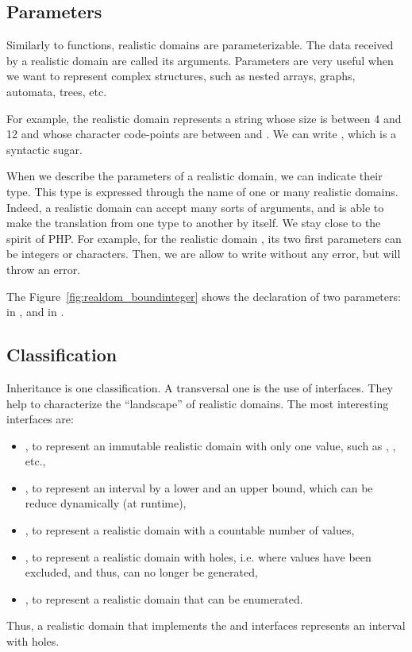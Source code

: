 \subsection{Parameters}

Similarly to functions, realistic domains are parameterizable. The data received
by a realistic domain are called its arguments. Parameters are very useful when
we want to represent complex structures, such as nested arrays, graphs,
automata, trees, etc.

For example, the realistic domain 
represents a string whose size is between 4 and 12 and whose character
code-points are between  and . We can write
, which is a syntactic sugar.

When we describe the parameters of a realistic domain, we can indicate their
type. This type is expressed through the name of one or many
realistic domains. Indeed, a realistic domain can accept many sorts of
arguments, and is able to make the translation from one type to another by
itself.  We stay close to the spirit of PHP. For example, for the realistic
domain , its two first parameters can be integers or characters.
Then, we are allow to write  without any error,
but  will throw an error.

The Figure~\ref{fig:realdom_boundinteger} shows the declaration of two
parameters:  in , and  in .

\subsection{Classification}\label{sec:domain}

Inheritance is one classification. A transversal one is the use of interfaces.
They help to characterize the ``landscape'' of realistic domains. The most
interesting interfaces are:
\begin{itemize}
\item {}, to represent an immutable realistic domain with only one
value, such as , , etc.,
\item {}, to represent an interval by a lower and an upper bound,
which can be reduce dynamically (at runtime),
\item {}, to represent a realistic domain with a countable number of
values,
\item {}, to represent a realistic domain with holes, i.e. where
values have been excluded, and thus, can no longer be generated,
\item {}, to represent a realistic domain that can be enumerated.
\end{itemize}

Thus, a realistic domain that implements the  and 
interfaces represents an interval with holes.
